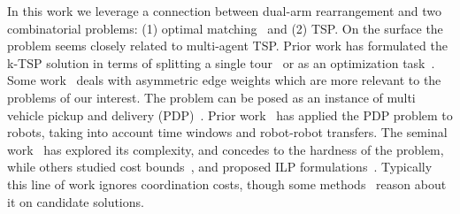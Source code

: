 
In this work we leverage a connection between dual-arm rearrangement and two combinatorial problems: (1) optimal matching~\cite{edmonds1965maximum} and (2) TSP. On the surface the problem seems closely related to multi-agent TSP.
Prior work has formulated the k-TSP solution in terms of splitting a single tour~\cite{frederickson1976approximation} or as an optimization task~\cite{rathinam2006matroid}.
Some work~\cite{friggstad2013multiple} deals with asymmetric edge weights which are more relevant to the problems of our interest. 
The problem can be posed as an instance of multi vehicle pickup and delivery (PDP)~\cite{parragh2008survey}. 
Prior work~\cite{coltin2014multi} has applied the PDP problem to robots, taking into account time windows and robot-robot transfers.
The seminal work~\cite{lenstra1981complexity,savelsbergh1995general} has explored its complexity, and concedes to the hardness of the problem, while others studied cost bounds~\cite{TrePavFra13}, and proposed ILP formulations~\cite{savelsbergh1995general}. 
Typically this line of work ignores coordination costs, though some methods~\cite{caricato2003parallel} reason about it on candidate solutions.

